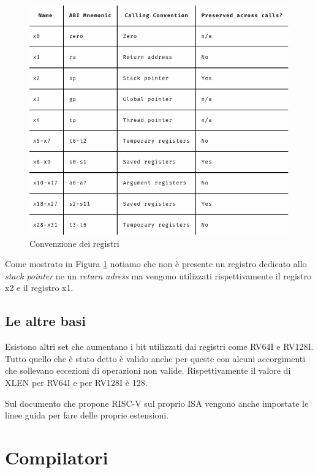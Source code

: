 \documentclass[12pt, a4paper]{report}
\begin{document}
\begin{figure}[h!]
\centering
	\includegraphics[scale=0.3]{ABI-RISC-V}
	\caption{Convenzione dei registri}
	\label{Fig:ConvenzioneRegistri}
\end{figure}

Come mostrato in Figura \ref{Fig:ConvenzioneRegistri} notiamo che non è presente un registro dedicato allo \textit{stack pointer} ne un \textit{return adress} ma vengono utilizzati rispettivamente il registro x2 e il registro x1.


\section{Le altre basi}
Esistono altri set che aumentano i bit utilizzati dai registri come RV64I e RV128I. Tutto quello che è stato detto è valido anche per queste con alcuni accorgimenti che sollevano eccezioni di operazioni non valide.
Rispettivamente il valore di XLEN per RV64I e per RV128I è 128.


Sul documento che propone RISC-V sul proprio ISA vengono anche impostate le linee guida per fare delle proprie estensioni.




\chapter{Compilatori}
\end{document}
